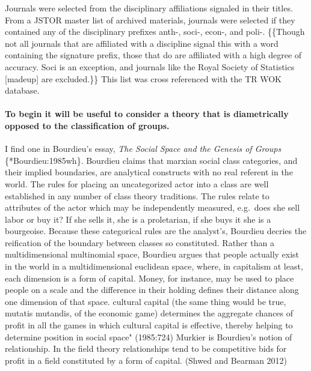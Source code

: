\documentclass[]{article}
\begin{document}
Journals were selected from the disciplinary affiliations signaled in
their titles. From a JSTOR master list of archived materials, journals
were selected if they contained any of the disciplinary prefixes anth-,
soci-, econ-, and poli-. \{\{Though not all journals that are affiliated
with a discipline signal this with a word containing the signature
prefix, those that do are affiliated with a high degree of accuracy.
Soci is an exception, and journals like the Royal Society of Statistics
{[}madeup{]} are excluded.\}\} This list was cross referenced with the
TR WOK database.

\paragraph{To begin it will be useful to consider a theory that is
diametrically opposed to the classification of
groups.}\label{to-begin-it-will-be-useful-to-consider-a-theory-that-is-diametrically-opposed-to-the-classification-of-groups.}

I find one in Bourdieu's essay, \emph{The Social Space and the Genesis
of Groups} \{*Bourdieu:1985wh\}. Bourdieu claims that marxian social
class categories, and their implied boundaries, are analytical
constructs with no real referent in the world. The rules for placing an
uncategorized actor into a class are well established in any number of
class theory traditions. The rules relate to attributes of the actor
which may be independently measured, e.g.~does she sell labor or buy it?
If she sells it, she is a proletarian, if she buys it she is a
bourgeoise. Because these categorical rules are the analyst's, Bourdieu
decries the reification of the boundary between classes so constituted.
Rather than a multidimensional multinomial space, Bourdieu argues that
people actually exist in the world in a multidimensional euclidean
space, where, in capitalism at least, each dimension is a form of
capital. Money, for instance, may be used to place people on a scale and
the difference in their holding defines their distance along one
dimension of that space. cultural capital (the same thing would be true,
mutatis mutandis, of the economic game) determines the aggregate chances
of profit in all the games in which cultural capital is effective,
thereby helping to determine position in social space" (1985:724)
Murkier is Bourdieu's notion of relationship. In the field theory
relationships tend to be competitive bids for profit in a field
constituted by a form of capital. (Shwed and Bearman 2012)
\end{document}
